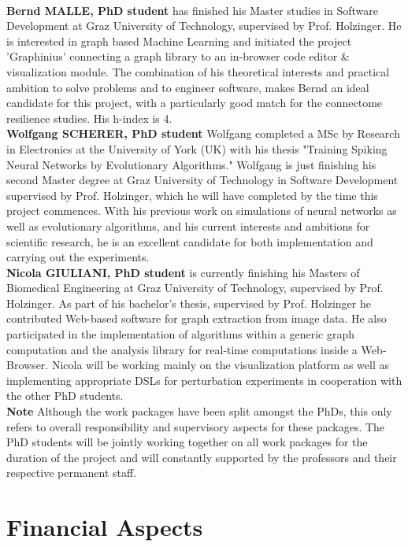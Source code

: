 \documentclass[a4paper,11pt]{article}
\begin{document}
\\[0,2cm]
\textbf{Bernd MALLE, PhD student}  has finished his Master studies in Software Development at Graz University of Technology, supervised by Prof. Holzinger. He is interested in graph based Machine Learning and initiated the project 'Graphinius' connecting a graph library to an in-browser code editor \& visualization module. The combination of his theoretical interests and practical ambition to solve problems and to engineer software, makes Bernd an ideal candidate for this project, with a particularly good match for the connectome resilience studies.  His h-index is 4.
\\[0,2cm]
\textbf{Wolfgang SCHERER, PhD student}
Wolfgang completed a MSc by Research in Electronics at the University of York (UK) with his thesis "Training Spiking Neural Networks by Evolutionary Algorithms." Wolfgang is just finishing his second Master degree at Graz University of Technology in Software Development supervised by Prof. Holzinger, which he will have completed by the time this project commences. With his previous work on simulations of neural networks as well as evolutionary algorithms, and his current interests and ambitions for scientific research, he is an excellent candidate for both implementation and carrying out the experiments.
\\[0,2cm]
\textbf{Nicola GIULIANI, PhD student} is currently	finishing	his	Masters	of	Biomedical	Engineering	at	Graz University	of Technology, supervised by Prof. Holzinger.	As	part of	his	bachelor's	thesis, supervised by Prof. Holzinger he contributed Web-based software	for	graph extraction from image	 data.	 He	 also participated in  the implementation of algorithms	within a generic graph computation and	the	analysis library for real‐time computations inside a Web‐Browser. Nicola will be working mainly on the visualization platform as well as implementing appropriate DSLs for perturbation experiments in cooperation with the other PhD students.
\\[0,2cm]
\textbf{Note} Although the work packages have been split amongst the PhDs, this only refers to overall responsibility and supervisory aspects for these packages. The PhD students will be jointly working together on all work packages for the duration of the project and will constantly supported by the professors and their respective permanent staff.


\section{Financial Aspects}
%
\end{document}
